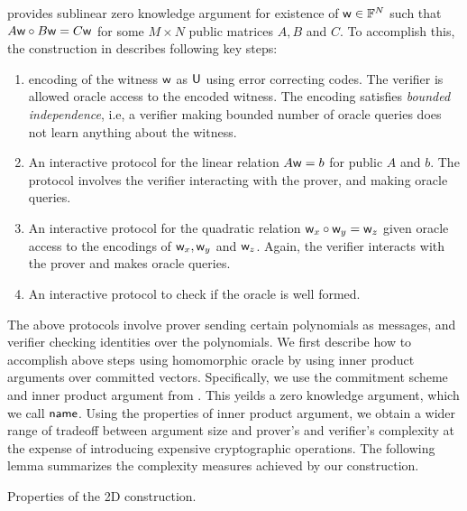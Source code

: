  provides sublinear zero knowledge argument for existence of
$\mathsf{w}\in \mathbb{F}^N$ such that $A\mathsf{w}\circ B\mathsf{w}=C\mathsf{w}$ for some $M\times N$ public
matrices $A,B$ and $C$. To accomplish this, the construction in \cite{ligero}
describes following key steps:
\begin{enumerate}[{\rm 1.}]
\item encoding of the witness $\mathsf{w}$ as $\mathsf{U}$ using error correcting codes.
The verifier is allowed oracle access to the encoded witness. The encoding
satisfies {\em bounded independence}, i.e, a verifier making bounded number of
oracle queries does not learn anything about the witness.
\item An interactive protocol for the linear relation $A\mathsf{w}=b$ for public $A$
and $b$. The protocol involves the verifier interacting with the prover, and
making oracle queries. 
\item An interactive protocol for the quadratic relation $\mathsf{w}_x\circ
\mathsf{w}_y=\mathsf{w}_z$ given oracle access to the encodings of $\mathsf{w}_x,\mathsf{w}_y$ and
$\mathsf{w}_z$. Again, the verifier interacts with the prover and makes oracle
queries. 
\item An interactive protocol to check if the oracle is well formed.
\end{enumerate}
The above protocols involve prover sending certain polynomials as messages, and
verifier checking identities over the polynomials. We first describe how to
accomplish above steps using homomorphic oracle by using inner product arguments
over committed vectors. Specifically, we use the commitment scheme and inner
product argument from \cite{Bulletproofs}. This yeilds a zero knowledge
argument, which we call $\textsf{name}$. Using the properties of inner product argument,
we obtain a wider range of tradeoff between argument size and prover's and
verifier's complexity at the expense of introducing expensive cryptographic
operations. The following lemma summarizes the complexity measures achieved by
our construction.
\begin{lemma}
Properties of the 2D construction.
\end{lemma}

